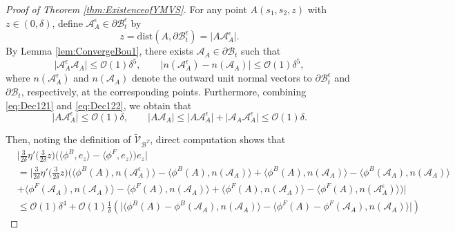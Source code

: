 \documentclass[11pt,twoside,reqno]{amsart}
\numberwithin{equation}{section}
\numberwithin{figure}{section}
\newcommand{\qnt}[1]{\left(#1\right)}
\begin{document}
\begin{proof}[Proof of Theorem \ref{thm:ExistenceofYMVS}]
For any point $A(s_1,s_2,z)$ with $z\in(0,\delta)$, define $\mathcal{A}^\epsilon_A\in\partial\mathcal{B}^\epsilon_t$ by
\begin{equation}\label{eq:Dec121}
    z=\mathrm{dist}(A,\partial\mathcal{B}^\epsilon_t)=\big|A\mathcal{A}^\epsilon_A\big|.
\end{equation}
By Lemma \ref{lem:ConvergeBou1}, there exists $\mathcal{A}_A\in \partial\mathcal{B}_t$ such that  
\begin{equation}\label{eq:Dec122}
    \big|\mathcal{A}_A^\epsilon\mathcal{A}_A\big|\leq\mathcal{O}(1)\delta^5, \qquad \big|n(\mathcal{A}_A^\epsilon)-n(\mathcal{A}_A)\big|\leq\mathcal{O}(1)\delta^5,
\end{equation}
where $n(\mathcal{A}_A^\epsilon)$ and $n(\mathcal{A}_A)$ denote the outward unit normal vectors to $\partial\mathcal{B}_t^\epsilon$ and $\partial\mathcal{B}_t$, respectively, at the corresponding points. Furthermore, combining \eqref{eq:Dec121} and \eqref{eq:Dec122}, we obtain that 
\begin{equation*}
    \big|A\mathcal{A}_A^\epsilon\big|\leq \mathcal{O}(1)\delta, \qquad\big|A\mathcal{A}_A\big|\leq \big|A\mathcal{A}_A^\epsilon\big|+\big|\mathcal{A}_A\mathcal{A}_A^\epsilon\big|\leq \mathcal{O}(1)\delta.
\end{equation*}

Then, noting the definition of $\tilde{\mathcal{V}}_{\mathcal{B}^T}$, direct computation shows that 
\begin{equation}\label{eq:JK1}
\begin{aligned}
&\big|\frac{3}{2\delta}\eta'\!\Big(\tfrac{3}{2\delta}z\Big)\Big(\langle\phi^B,e_z\rangle -\langle\phi^F,e_z\rangle\Big)e_z\big|\\
&=\Big|\frac{3}{2\delta}\eta'\!\Big(\tfrac{3}{2\delta}z\Big)\Big(\langle\phi^B(A),n(\mathcal{A}^\epsilon_A)\rangle-\langle\phi^B(A),n(\mathcal{A}_A)\rangle+\langle\phi^B(A),n(\mathcal{A}_A)\rangle-\langle\phi^B(\mathcal{A}_A),n(\mathcal{A}_A)\rangle\\
&+\langle\phi^F(\mathcal{A}_A),n(\mathcal{A}_A)\rangle-
\langle\phi^F(A),n(\mathcal{A}_A)\rangle
+\langle\phi^F(A),n(\mathcal{A}_A)\rangle-\langle\phi^F(A),n(\mathcal{A}^\epsilon_A)\rangle\Big)\Big|\\
&\leq\mathcal{O}(1)\delta^4+\mathcal{O}(1)\frac{1}{\delta} \qnt{\Big|\langle\phi^B(A)-\phi^B(\mathcal{A}_A),n(\mathcal{A}_A)\rangle-\langle\phi^F(A)-\phi^F(\mathcal{A}_A),n(\mathcal{A}_A)\rangle\Big|  }          
\end{aligned}
\end{equation}


\end{proof}
\end{document}
